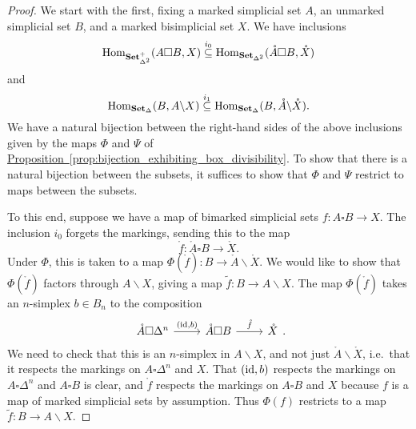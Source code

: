 \documentclass[main.tex]{subfiles}
\begin{document}
\begin{proof}
  We start with the first, fixing a marked simplicial set $A$, an unmarked simplicial set $B$, and a marked bisimplicial set $X$. We have inclusions
  \begin{equation*}
    \mathrm{Hom}_{\mathbf{Set}_{\Delta^{2}}^{+}}(A \square B, X) \overset{i_{0}}{\subseteq} \mathrm{Hom}_{\mathbf{Set}_{\Delta^{2}}}(\mathring{A} \square B, \mathring{X})
  \end{equation*}
  and
  \begin{equation*}
    \mathrm{Hom}_{\mathbf{Set}_{\Delta}}(B, A \backslash X) \overset{i_{1}}{\subseteq} \mathrm{Hom}_{\mathbf{Set}_{\Delta}}(B, \mathring{A} \backslash \mathring{X}).
  \end{equation*}
  We have a natural bijection between the right-hand sides of the above inclusions given by the maps $\Phi$ and $\Psi$ of \hyperref[prop:bijection_exhibiting_box_divisibility]{Proposition~\ref*{prop:bijection_exhibiting_box_divisibility}}. To show that there is a natural bijection between the subsets, it suffices to show that $\Phi$ and $\Psi$ restrict to maps between the subsets.

  To this end, suppose we have a map of bimarked simplicial sets $f\colon A \square B \to X$. The inclusion $i_{0}$ forgets the markings, sending this to the map
  \begin{equation*}
    \mathring{f}\colon \mathring{A} \square B \to \mathring{X}.
  \end{equation*}
  Under $\Phi$, this is taken to a map $\Phi(\mathring{f}) \colon B \to \mathring{A} \backslash \mathring{X}$. We would like to show that $\Phi(\mathring{f})$ factors through $A \backslash X$, giving a map $\tilde{f}\colon B \to A \backslash X$. The map $\Phi(\mathring{f})$ takes an $n$-simplex $b \in B_{n}$ to the composition
  \begin{equation*}
    \begin{tikzcd}
      \mathring{A} \square \Delta^{n}
      \arrow[r, "{(\id, b)}"]
      & \mathring{A} \square B
      \arrow[r, "\mathring{f}"]
      & \mathring{X}
    \end{tikzcd}.
  \end{equation*}
  We need to check that this is an $n$-simplex in $A \backslash X$, and not just $\mathring{A} \backslash \mathring{X}$, i.e.\ that it respects the markings on $A \square \Delta^{n}$ and $X$. That $(\mathrm{id}, b)$ respects the markings on $A \square \Delta^{n}$ and $A \square B$ is clear, and $\mathring{f}$ respects the markings on $A \square B$ and $X$ because $f$ is a map of marked simplicial sets by assumption. Thus $\Phi(f)$ restricts to a map $\tilde{f}\colon B \to A \backslash X$.


\end{proof}
\end{document}
